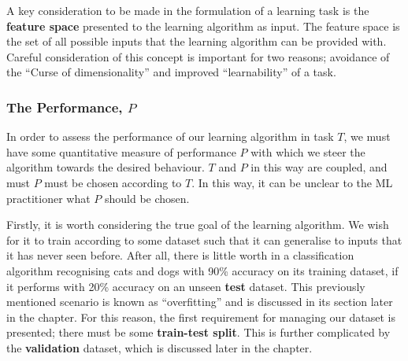 A key consideration to be made in the formulation of a learning task is the \textbf{feature space} presented to the learning algorithm as input. The feature space is the set of all possible inputs that the learning algorithm can be provided with. Careful consideration of this concept is important for two reasons; avoidance of the ``Curse of dimensionality'' \label{point:curse_of_dimensionality_1} and improved ``learnability'' of a task. 



\subsubsection{The Performance, $P$}\label{sec:ML-performance}
In order to assess the performance of our learning algorithm in task $T$,
we must have some quantitative measure of performance $P$ with which we steer
the algorithm towards the desired behaviour. $T$ and $P$ in this way are
coupled, and must $P$ must be chosen according to $T$. In this way, it can be
unclear to the \gls{ML} practitioner what $P$ should be chosen.

Firstly, it is worth considering the true goal of the learning algorithm. We
wish for it to train according to some dataset such that it can generalise to
inputs that it has never seen before. After all, there is little worth in a
classification algorithm recognising cats and dogs with 90\% accuracy on its
training dataset, if it performs with 20\% accuracy on an unseen \textbf{test}
dataset. This previously mentioned scenario is known as ``overfitting'' and
is discussed in its section later in the chapter. For this reason, the first
requirement for managing our dataset is presented; there must be some
\textbf{train-test split}. This is further complicated by the
\textbf{validation} dataset, which is discussed later in the chapter.

